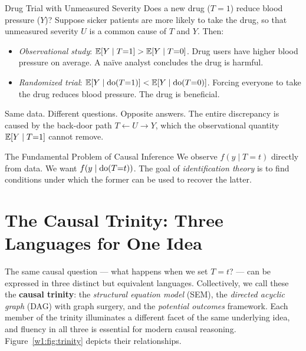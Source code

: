 \documentclass[master.tex]{subfiles}
\begin{document}
\begin{example}{Drug Trial with Unmeasured Severity}
Does a new drug ($T=1$) reduce blood pressure ($Y$)?  Suppose sicker patients
are more likely to take the drug, so that unmeasured severity $U$ is a common
cause of $T$ and $Y$.  Then:
\begin{itemize}
  \item \emph{Observational study}: $\mathbb{E}[Y \mid T{=}1] > \mathbb{E}[Y \mid T{=}0]$.
        Drug users have higher blood pressure on average.  A na\"{i}ve analyst
        concludes the drug is harmful.
  \item \emph{Randomized trial}: $\mathbb{E}[Y \mid \mathrm{do}(T{=}1)] < \mathbb{E}[Y \mid
        \mathrm{do}(T{=}0)]$.  Forcing everyone to take the drug reduces blood
        pressure.  The drug is beneficial.
\end{itemize}
Same data.  Different questions.  Opposite answers.  The entire discrepancy
is caused by the back-door path $T \leftarrow U \to Y$, which the
observational quantity $\mathbb{E}[Y \mid T{=}1]$ cannot remove.
\end{example}

\begin{warn}{The Fundamental Problem of Causal Inference}
We observe $f(y \mid T{=}t)$ directly from data.  We want
$f(y \mid \mathrm{do}(T{=}t))$.  The goal of \emph{identification theory} is to
find conditions under which the former can be used to recover the latter.
\end{warn}

\section{The Causal Trinity: Three Languages for One Idea}

The same causal question --- what happens when we set $T = t$? --- can be
expressed in three distinct but equivalent languages. Collectively, we call
these the \textbf{causal trinity}: the \emph{structural equation model} (SEM),
the \emph{directed acyclic graph} (DAG) with graph surgery, and the
\emph{potential outcomes} framework. Each member of the trinity illuminates a
different facet of the same underlying idea, and fluency in all three is
essential for modern causal reasoning. Figure~\ref{w1:fig:trinity} depicts their
relationships.
\end{document}
